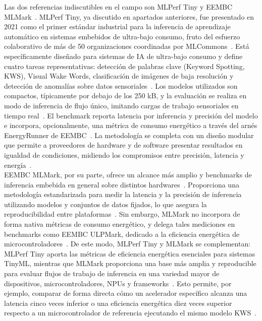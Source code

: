 \documentclass[a4paper,12pt,twoside,final]{book}
\begin{document}
Las dos referencias indiscutibles en el campo son MLPerf Tiny y EEMBC MLMark~\cite{somvanshi2025acm}. MLPerf Tiny,
ya discutido en apartados anteriores, fue presentado en 2021 como el primer estándar industrial para la inferencia
de aprendizaje automático en sistemas embebidos de ultra-bajo consumo, fruto del esfuerzo colaborativo de más de 50
organizaciones coordinadas por MLCommons~\cite{banbury2021mlperf}. Está específicamente diseñado para sistemas de IA
de ultra-bajo consumo y define cuatro tareas representativas: detección de palabras clave (Keyword Spotting, KWS),
Visual Wake Words, clasificación de imágenes de baja resolución y detección de anomalías sobre datos
sensoriales~\cite{somvanshi2025acm,banbury2021mlperf}. Los modelos utilizados son compactos, típicamente por debajo
de los 250 kB, y la evaluación se realiza en modo de inferencia de flujo único, imitando cargas de trabajo
sensoriales en tiempo real~\cite{somvanshi2025acm,banbury2021mlperf}. El benchmark reporta latencia por inferencia y
precisión del modelo e incorpora, opcionalmente, una métrica de consumo energético a través del arnés EnergyRunner
de EEMBC~\cite{somvanshi2025acm}. La metodología se completa con un diseño modular que permite a proveedores de
hardware y de software presentar resultados en igualdad de condiciones, midiendo los compromisos entre precisión,
latencia y energía~\cite{banbury2021mlperf}.\\

EEMBC MLMark, por su parte, ofrece un alcance más amplio y benchmarks de inferencia embebida en general sobre
distintos hardwares~\cite{somvanshi2025acm}. Proporciona una metodología estandarizada para medir la latencia y la
precisión de inferencia utilizando modelos y conjuntos de datos fijados, lo que asegura la reproducibilidad entre
plataformas~\cite{somvanshi2025acm}. Sin embargo, MLMark no incorpora de forma nativa métricas de consumo
energético, y delega tales mediciones en benchmarks como EEMBC ULPMark, dedicado a la eficiencia energética de
microcontroladores~\cite{somvanshi2025acm}. De este modo, MLPerf Tiny y MLMark se complementan: MLPerf Tiny aporta
las métricas de eficiencia energética esenciales para sistemas TinyML, mientras que MLMark proporciona una base más
amplia y reproducible para evaluar flujos de trabajo de inferencia en una variedad mayor de dispositivos,
microcontroladores, NPUs y frameworks~\cite{somvanshi2025acm}. Esto permite, por ejemplo, comparar de forma directa
cómo un acelerador específico alcanza una latencia cinco veces inferior o una eficiencia energética diez veces
superior respecto a un microcontrolador de referencia ejecutando el mismo modelo KWS~\cite{somvanshi2025acm}.\\
\end{document}
